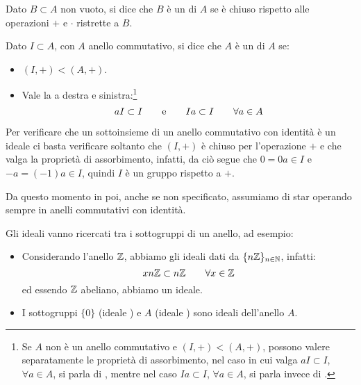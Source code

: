 \documentclass[11pt]{scrartcl}
\begin{document}
\begin{definition}
    Dato $B \subset A$ non vuoto, si dice che $B$ è un  di $A$ se è chiuso rispetto alle operazioni $+$ e $\cdot$ ristrette a $B$.
\end{definition}

\begin{definition}
    Dato $I \subset A$, con $A$ anello commutativo, si dice che $A$ è un  di $A$ se:
    \begin{itemize}
        \item $(I,+) < (A,+)$.
        \item Vale la  a destra e sinistra:\footnote{Se $A$ non è un anello commutativo e $(I,+) < (A,+)$, possono
        valere separatamente le proprietà di assorbimento, nel caso in cui valga $aI \subset I$, $\forall a \in A$, si parla di , mentre nel caso 
        $Ia \subset I$, $\forall a \in A$, si parla invece di .}
            \[ aI \subset I \qquad \text e \qquad Ia \subset I \qquad \forall a \in A
                \]
    \end{itemize}
\end{definition}

\begin{remark}
    Per verificare che un sottoinsieme di un anello commutativo con identità è un ideale ci basta verificare soltanto che $(I,+)$ è chiuso per l'operazione $+$ e che valga la proprietà di assorbimento, infatti, da ciò segue che $0 = 0a \in I$ e $-a = (-1)a \in I$, quindi $I$ è un gruppo rispetto a $+$.
\end{remark}

Da questo momento in poi, anche se non specificato, assumiamo di star operando sempre in anelli commutativi con identità.

\begin{example}[Ideali]
    Gli ideali vanno ricercati tra i sottogruppi di un anello, ad esempio:
    \begin{itemize}
        \item Considerando l'anello $\mathbb Z$, abbiamo gli ideali dati da $\{n\mathbb Z\}_{n \in \mathbb N}$, infatti:
            \[ xn\mathbb Z \subset n\mathbb Z \qquad \forall x \in \mathbb Z
                \]
        ed essendo $\mathbb Z$ abeliano, abbiamo un ideale.
        \item I sottogruppi $\{0\}$ (ideale ) e $A$ (ideale ) sono ideali dell'anello $A$.
    \end{itemize}
\end{example}
\end{document}
